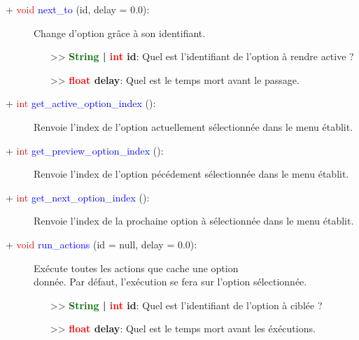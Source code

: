 \documentclass[a4paper, 11pt]{article}
\begin{document}
	\begin{description}
		\item [+ \textcolor{red}{void} \textcolor{blue}{next\_to} (id, delay = 0.0):] Change d'option grâce
		à son identifiant.
		\begin{itemize}
			\item [>> \textbf{\textcolor{darkgreen}{String} | \textcolor{red}{int} id}:] Quel est 
			l'identifiant de l'option à rendre active ?
			\item [>> \textbf{\textcolor{red}{float} delay}:] Quel est le temps mort avant le passage.\\
		\end{itemize}
	\end{description}
	\begin{description}
		\item [+ \textcolor{red}{int} \textcolor{blue}{get\_active\_option\_index} ():] Renvoie l'index de
		l'option actuellement sélectionnée dans le menu établit.\\
	\end{description}
	\begin{description}
		\item [+ \textcolor{red}{int} \textcolor{blue}{get\_preview\_option\_index} ():] Renvoie l'index de
		l'option pécédement sélectionnée dans le menu établit.\\
	\end{description}
	\begin{description}
		\item [+ \textcolor{red}{int} \textcolor{blue}{get\_next\_option\_index} ():] Renvoie l'index de
		la prochaine option à sélectionnée dans le menu établit.\\
	\end{description}
	\begin{description}
		\item [+ \textcolor{red}{void} \textcolor{blue}{\hypertarget{runactions}{run\_actions}} (id = null, 
		delay = 0.0):] Exécute toutes les actions que cache une option \\donnée. Par défaut, l'exécution se 
		fera sur l'option sélectionnée.
		\begin{itemize}
			\item [>> \textbf{\textcolor{darkgreen}{String} | \textcolor{red}{int} id}:] Quel est 
			l'identifiant de l'option à ciblée ?
			\item [>> \textbf{\textcolor{red}{float} delay}:] Quel est le temps mort avant les éxécutions.\\
		\end{itemize}
	\end{description}
\end{document}
